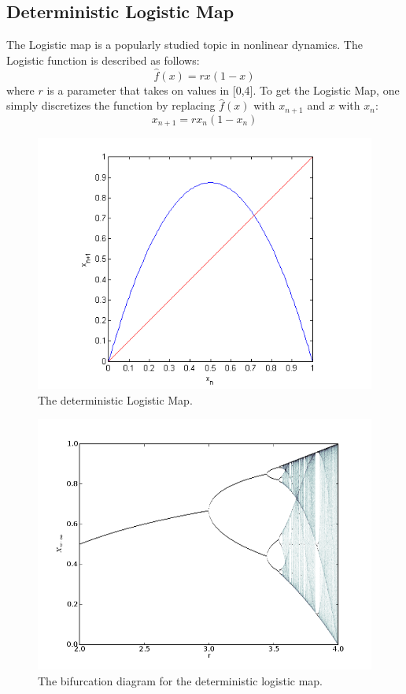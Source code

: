 \documentclass[12pt]{article}
\begin{document}
\subsection{Deterministic Logistic Map}
The Logistic map is a popularly studied topic in nonlinear
dynamics. The Logistic function is described as follows:
\begin{equation}\label{orig}
\hat{f}(x) = rx(1-x)
\end{equation}
where $r$ is a parameter that takes on values in [0,4]. To get the
Logistic Map, one simply discretizes the function by replacing
$\hat{f}(x)$ with $x_{n+1}$ and $x$ with $x_n$:
\begin{equation*}
x_{n+1}=rx_n(1-x_n)
\end{equation*}
\begin{figure}[H]
	\begin{center}
		\includegraphics[scale=0.7]{deterministic}
\caption{The deterministic Logistic Map.}
	\end{center}
\end{figure}
\begin{figure}[H]
	\begin{center}
		\includegraphics[scale=0.3]{det_bif}
\caption{The bifurcation diagram for the deterministic logistic map.}
	\end{center}
\end{figure}
\end{document}
